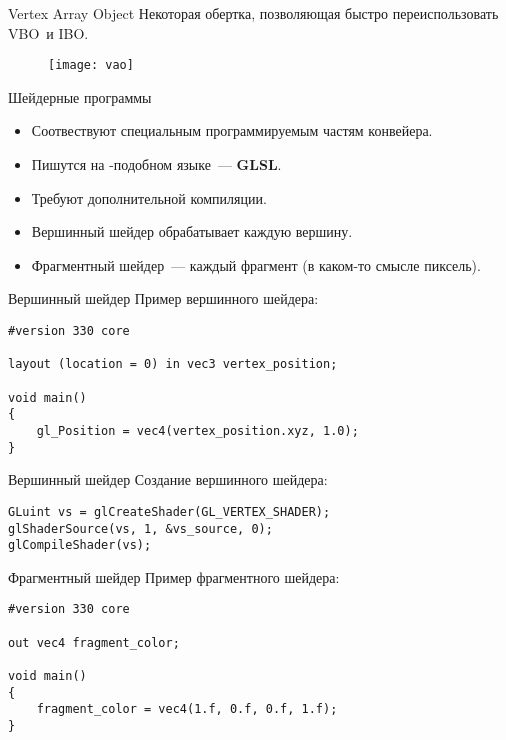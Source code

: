 \documentclass{beamer}
\begin{document}
\begin{frame}[fragile]{Vertex Array Object}
    Некоторая обертка, позволяющая быстро переиспользовать VBO~и IBO.
    \begin{figure}[htp]
        \centering
        \texttt{[image: vao]}
    \end{figure}
\end{frame}

\begin{frame}[fragile]{Шейдерные программы}
    \begin{itemize}
        \item Соотвествуют специальным программируемым частям конвейера.
        \item Пишутся на \langc-подобном языке~--- {\bf GLSL}.
        \item Требуют дополнительной компиляции.
        \item Вершинный шейдер обрабатывает каждую вершину.
        \item Фрагментный шейдер~--- каждый фрагмент (в каком-то смысле пиксель).
    \end{itemize}
\end{frame}

\begin{frame}[fragile]{Вершинный шейдер}
    Пример вершинного шейдера:
    {\small \begin{lstlisting}
#version 330 core

layout (location = 0) in vec3 vertex_position;

void main()
{
    gl_Position = vec4(vertex_position.xyz, 1.0);
}
    \end{lstlisting}}
\end{frame}

\begin{frame}[fragile]{Вершинный шейдер}
    Создание вершинного шейдера:
    {\small \begin{lstlisting}
GLuint vs = glCreateShader(GL_VERTEX_SHADER);
glShaderSource(vs, 1, &vs_source, 0);
glCompileShader(vs);
    \end{lstlisting}}
\end{frame}

\begin{frame}[fragile]{Фрагментный шейдер}
    Пример фрагментного шейдера:
    {\small \begin{lstlisting}
#version 330 core

out vec4 fragment_color;

void main()
{
    fragment_color = vec4(1.f, 0.f, 0.f, 1.f);
}
    \end{lstlisting}}
\end{frame}
\end{document}
